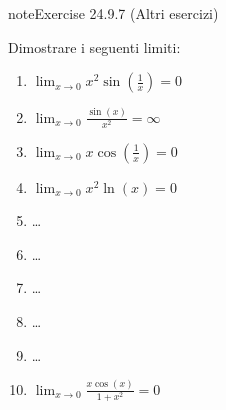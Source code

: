 \documentclass[letterpaper,10pt,italian]{jupyterBook}
\begin{document}
\begin{sphinxadmonition}{note}{Exercise 24.9.7 (Altri esercizi)}





\sphinxAtStartPar
Dimostrare i seguenti limiti:
\begin{enumerate}
%
\item {} 
\sphinxAtStartPar
\(\lim_{x \to 0} x^2 \sin\left(\frac{1}{x}\right) = 0\)

\item {} 
\sphinxAtStartPar
\(\lim_{x \to 0} \frac{\sin(x)}{x^2} = \infty\)

\item {} 
\sphinxAtStartPar
\(\lim_{x \to 0} x \cos\left(\frac{1}{x}\right) = 0\)

\item {} 
\sphinxAtStartPar
\(\lim_{x \to 0} x^2 \ln(x) = 0\)

\item {} 
\sphinxAtStartPar
…

\item {} 
\sphinxAtStartPar
…

\item {} 
\sphinxAtStartPar
…

\item {} 
\sphinxAtStartPar
…

\item {} 
\sphinxAtStartPar
…

\item {} 
\sphinxAtStartPar
\(\lim_{x \to 0} \frac{x \cos(x)}{1 + x^2} = 0\)

\end{enumerate}
\end{sphinxadmonition}
\end{document}
